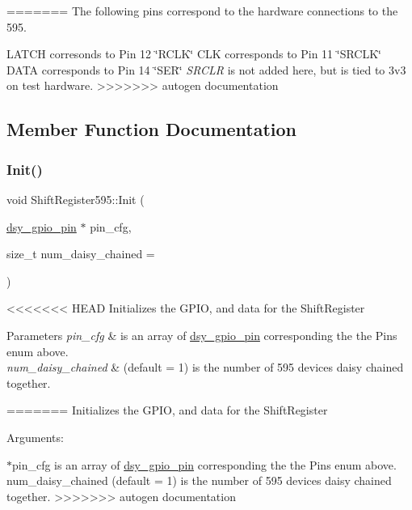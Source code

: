 =======
The following pins correspond to the hardware connections to the 595.

L\+A\+T\+CH corresonds to Pin 12 \char`\"{}\+R\+C\+L\+K\char`\"{} C\+LK corresponds to Pin 11 \char`\"{}\+S\+R\+C\+L\+K\char`\"{} D\+A\+TA corresponds to Pin 14 \char`\"{}\+S\+E\+R\char`\"{} {\itshape S\+R\+C\+LR} is not added here, but is tied to 3v3 on test hardware. 
>>>>>>> autogen documentation

\subsection{Member Function Documentation}
\mbox{\label{class_shift_register595_acc9e7d74069edd4b2711a9de01e9617c}} 
\subsubsection{\texorpdfstring{Init()}{Init()}}
{\footnotesize\ttfamily void Shift\+Register595\+::\+Init (\begin{DoxyParamCaption}\item[{\hyperlink{structdsy__gpio__pin}{dsy\+\_\+gpio\+\_\+pin} $\ast$}]{pin\+\_\+cfg,  }\item[{size\+\_\+t}]{num\+\_\+daisy\+\_\+chained = {} }\end{DoxyParamCaption})}

<<<<<<< HEAD
Initializes the G\+P\+IO, and data for the Shift\+Register 
\begin{DoxyParams}{Parameters}
{\em pin\+\_\+cfg} & is an array of \hyperlink{structdsy__gpio__pin}{dsy\+\_\+gpio\+\_\+pin} corresponding the the Pins enum above. \\
\hline
{\em num\+\_\+daisy\+\_\+chained} & (default = 1) is the number of 595 devices daisy chained together. \\
\hline
\end{DoxyParams}
\mbox{\label{class_shift_register595_a01d31561cd07890ea52d1f39e55a8385}} 
=======
Initializes the G\+P\+IO, and data for the Shift\+Register

Arguments\+:

$\ast$pin\+\_\+cfg is an array of \hyperlink{structdsy__gpio__pin}{dsy\+\_\+gpio\+\_\+pin} corresponding the the Pins enum above. num\+\_\+daisy\+\_\+chained (default = 1) is the number of 595 devices daisy chained together. \mbox{\label{class_shift_register595_a01d31561cd07890ea52d1f39e55a8385}} 
>>>>>>> autogen documentation
